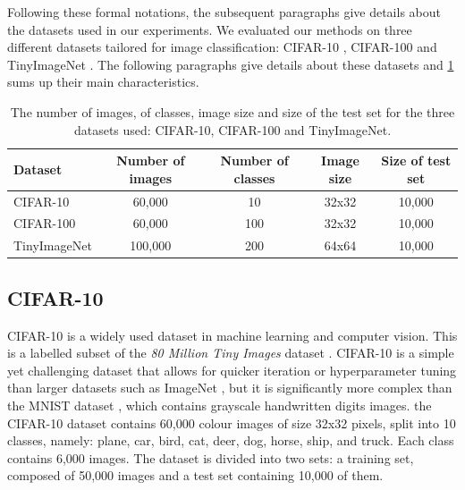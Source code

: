 Following these formal notations, the subsequent paragraphs give details about
the datasets used in our experiments. We evaluated our methods on three
different datasets tailored for image classification: CIFAR-10
\cite{CIFARdataset}, CIFAR-100 \cite{CIFARdataset} and TinyImageNet
\cite{TinyImageNet}. The following paragraphs give details about these datasets
and \cref{tab:dlo:datasets} sums up their main characteristics.\\

\begin{table}[ht!]
  \centering
  \begin{tabular}{lcccc}
    \toprule
    \textbf{Dataset}    & \textbf{Number of images} & \textbf{Number of classes} &
    \textbf{Image size} & \textbf{Size of test set}                                               \\
    \hline
    CIFAR-10            & 60,000                    & 10                         & 32x32 & 10,000 \\
    CIFAR-100           & 60,000                    & 100                        & 32x32 & 10,000 \\
    TinyImageNet        & 100,000                   & 200                        & 64x64 & 10,000 \\
    \bottomrule
  \end{tabular}
  \caption{The number of images, of classes, image size and size of the test
    set for the three datasets used: CIFAR-10, CIFAR-100 and TinyImageNet.}
  \label{tab:dlo:datasets}
\end{table}

\subsection{CIFAR-10}

CIFAR-10 \cite{CIFARdataset} is a widely used dataset in machine learning and
computer vision. This is a labelled subset of the \emph{80 Million Tiny Images}
dataset \cite{4531741}. CIFAR-10 is a simple yet challenging dataset that allows
for quicker iteration or hyperparameter tuning than larger datasets such as
ImageNet \cite{DBLP:journals/ijcv/RussakovskyDSKS15}, but it is significantly
more complex than the MNIST dataset \cite{6296535}, which contains grayscale
handwritten digits images. the CIFAR-10 dataset contains 60,000 colour images of
size 32x32 pixels, split into 10 classes, namely: plane, car, bird, cat, deer,
dog, horse, ship, and truck. Each class contains 6,000 images. The dataset is
divided into two sets: a training set, composed of 50,000 images and a test set
containing 10,000 of them.\\

